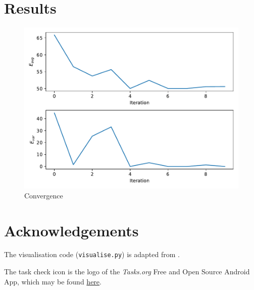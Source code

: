 \documentclass{prettytex/ox/mmsc-special-topic}
\begin{document}
  \section{Results}
  \begin{figure}[H]
    \centering
    \includegraphics[width=0.8\linewidth]{results/convergence.pdf}
    \caption{Convergence}
  \end{figure}

  \section{Acknowledgements}
  The visualisation code (\texttt{visualise.py}) is adapted from \cite{monte-carlo-todo-lists}.

  The task check icon is the logo of the \textit{Tasks.org} Free and Open Source Android App, which may be found \href{https://github.com/tasks/tasks/tree/main/graphics}{here}.

  \pagebreak
  \printbibliography
  \printnoidxglossary[type=acronym]

\end{document}
